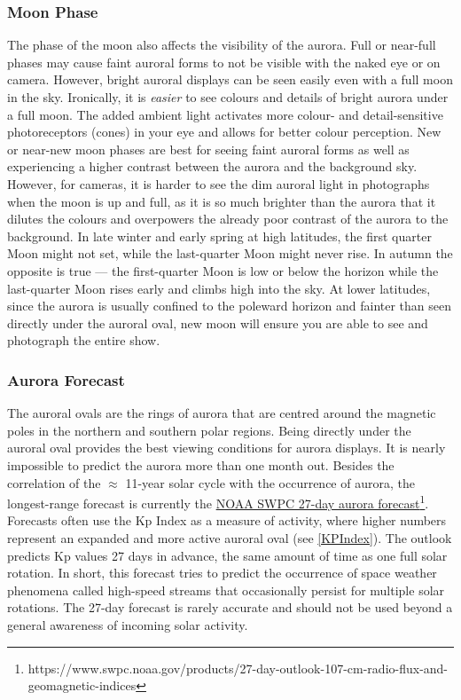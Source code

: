 \documentclass{article}
\begin{document}
\subsubsection{Moon Phase}
The phase of the moon also affects the visibility of the aurora. Full or near-full phases may cause faint auroral forms to not be visible with the naked eye or on camera. However, bright auroral displays can be seen easily even with a full moon in the sky. Ironically, it is \textit{easier} to see colours and details of bright aurora under a full moon. The added ambient light activates more colour- and detail-sensitive photoreceptors (cones) in your eye and allows for better colour perception. New or near-new moon phases are best for seeing faint auroral forms as well as experiencing a higher contrast between the aurora and the background sky. However, for cameras, it is harder to see the dim auroral light in photographs when the moon is up and full, as it is so much brighter than the aurora that it dilutes the colours and overpowers the already poor contrast of the aurora to the background. In late winter and early spring at high latitudes, the first quarter Moon might not set, while the last-quarter Moon might never rise. In autumn the opposite is true — the first-quarter Moon is low or below the horizon while the last-quarter Moon rises early and climbs high into the sky. At lower latitudes, since the aurora is usually confined to the poleward horizon and fainter than seen directly under the auroral oval, new moon will ensure you are able to see and photograph the entire show.

\subsubsection{Aurora Forecast}

The auroral ovals are the rings of aurora that are centred around the magnetic poles in the northern and southern polar regions. Being directly under the auroral oval provides the best viewing conditions for aurora displays. It is nearly impossible to predict the aurora more than one month out. Besides the correlation of the $\approx$ 11-year solar cycle with the occurrence of aurora, the longest-range forecast is currently the \href{https://www.swpc.noaa.gov/products/27-day-outlook-107-cm-radio-flux-and-geomagnetic-indices}{NOAA SWPC 27-day aurora forecast}\footnote{https://www.swpc.noaa.gov/products/27-day-outlook-107-cm-radio-flux-and-geomagnetic-indices}. Forecasts often use the Kp Index as a measure of activity, where higher numbers represent an expanded and more active auroral oval (see \ref{KPIndex}). The outlook predicts Kp values 27 days in advance, the same amount of time as one full solar rotation. In short, this forecast tries to predict the occurrence of space weather phenomena called high-speed streams that occasionally persist for multiple solar rotations. The 27-day forecast is rarely accurate and should not be used beyond a general awareness of incoming solar activity.
\end{document}
